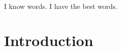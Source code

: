 \begin{savequote}[75mm]
I know words. I have the best words.
\end{savequote}

\chapter{Introduction}
\label{introduction}




